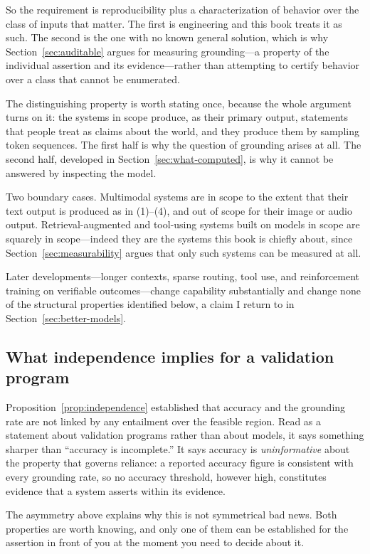 So the requirement is reproducibility plus a characterization of behavior over the
class of inputs that matter. The first is engineering and this book treats it as
such. The second is the one with no known general solution, which is why
Section~\ref{sec:auditable} argues for measuring grounding---a property of the
individual assertion and its evidence---rather than attempting to certify behavior
over a class that cannot be enumerated.

The distinguishing property is worth stating once, because the whole argument turns
on it: the systems in scope produce, as their primary output, statements that people
treat as claims about the world, and they produce them by sampling token sequences.
The first half is why the question of grounding arises at all. The second half,
developed in Section~\ref{sec:what-computed}, is why it cannot be answered by
inspecting the model.

Two boundary cases. Multimodal systems are in scope to the extent that their
text output is produced as in (1)--(4), and out of scope for their image or audio
output. Retrieval-augmented and tool-using systems built on models in scope are
squarely in scope---indeed they are the systems this book is chiefly about, since
Section~\ref{sec:measurability} argues that only such systems can be measured at
all.

Later developments---longer contexts, sparse routing, tool use, and
reinforcement training on verifiable outcomes---change capability substantially and
change none of the structural properties identified below, a claim I return to in
Section~\ref{sec:better-models}.

\subsection{What independence implies for a validation program}

Proposition~\ref{prop:independence} established that accuracy and the grounding
rate are not linked by any entailment over the feasible region. Read as a statement about
validation programs rather than about models, it says something sharper than
``accuracy is incomplete.'' It says accuracy is \emph{uninformative} about the
property that governs reliance: a reported accuracy figure is consistent with every
grounding rate, so no accuracy threshold, however high, constitutes evidence that a
system asserts within its evidence.

The asymmetry above explains why this is not symmetrical bad news. Both properties
are worth knowing, and only one of them can be established for the assertion in
front of you at the moment you need to decide about it.

